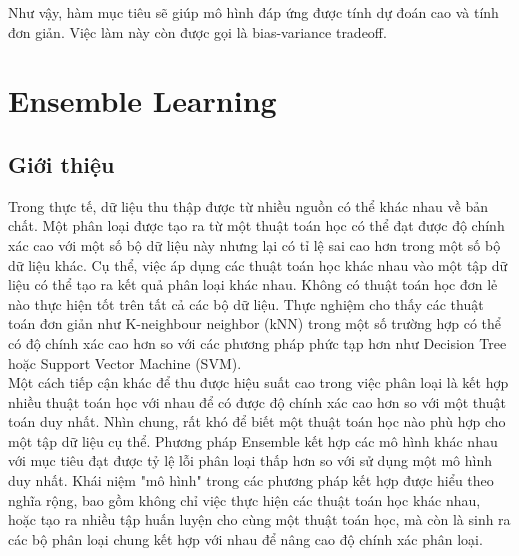 Như vậy, hàm mục tiêu sẽ giúp mô hình đáp ứng được tính dự đoán cao và tính đơn giản. Việc làm này còn được gọi là bias-variance tradeoff\cite{tradeoff}.
\section{Ensemble Learning}
\subsection{Giới thiệu}
Trong thực tế, dữ liệu thu thập được từ nhiều nguồn có thể khác nhau về bản chất. Một phân loại được tạo ra từ một thuật toán học có thể đạt được độ chính xác cao với một số bộ dữ liệu này nhưng lại có tỉ lệ sai cao hơn trong một số bộ dữ liệu khác. Cụ thể, việc áp dụng các thuật toán học khác nhau vào một tập dữ liệu có thể tạo ra kết quả phân loại khác nhau. Không có thuật toán học đơn lẻ nào thực hiện tốt trên tất cả các bộ dữ liệu. Thực nghiệm cho thấy các thuật toán đơn giản như K-neighbour neighbor (kNN) trong một số trường hợp có thể có độ chính xác cao hơn so với các phương pháp phức tạp hơn như Decision Tree hoặc Support Vector Machine (SVM). 
\\Một cách tiếp cận khác để thu được hiệu suất cao trong việc phân loại là kết hợp nhiều thuật toán học với nhau để có được độ chính xác cao hơn so với một thuật toán duy nhất. Nhìn chung, rất khó để biết một thuật toán học nào phù hợp cho một tập dữ liệu cụ thể. Phương pháp Ensemble kết hợp các mô hình khác nhau với mục tiêu đạt được tỷ lệ lỗi phân loại thấp hơn so với sử dụng một mô hình duy nhất. Khái niệm "mô hình" trong các phương pháp kết hợp được hiểu theo nghĩa rộng, bao gồm không chỉ việc thực hiện các thuật toán học khác nhau, hoặc tạo ra nhiều tập huấn luyện cho cùng một thuật toán học, mà còn là sinh ra các bộ phân loại chung kết hợp với nhau để nâng cao độ chính xác phân loại.
